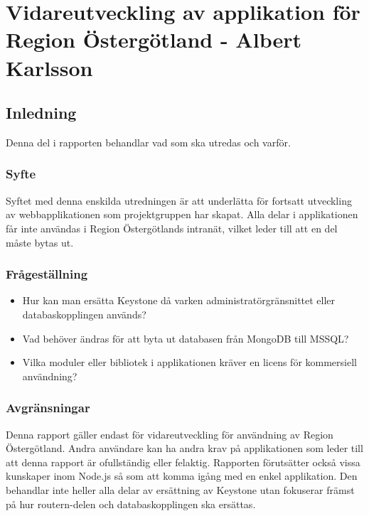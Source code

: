 \section{Vidareutveckling av applikation för Region Östergötland - Albert Karlsson}
\subsection{Inledning}
Denna del i rapporten behandlar vad som ska utredas och varför.
\subsubsection{Syfte}
Syftet med denna enskilda utredningen är att underlätta för fortsatt utveckling av webbapplikationen som projektgruppen har skapat. Alla delar i applikationen får inte användas i Region Östergötlands intranät, vilket leder till att en del måste bytas ut.
\subsubsection{Frågeställning}
\begin{itemize}
\item Hur kan man ersätta Keystone då varken administratörgränsnittet eller databaskopplingen används?
\item Vad behöver ändras för att byta ut databasen från MongoDB till MSSQL?
\item Vilka moduler eller bibliotek i applikationen kräver en licens för kommersiell användning?

\end{itemize}
\subsubsection{Avgränsningar}
Denna rapport gäller endast för vidareutveckling för användning av Region Östergötland. Andra användare kan ha andra krav på applikationen som leder till att denna rapport är ofullständig eller felaktig. Rapporten förutsätter också vissa kunskaper inom Node.js så som att komma igång med en enkel applikation. Den behandlar inte heller alla delar av ersättning av Keystone utan fokuserar främst på hur routern-delen och databaskopplingen ska ersättas.  
